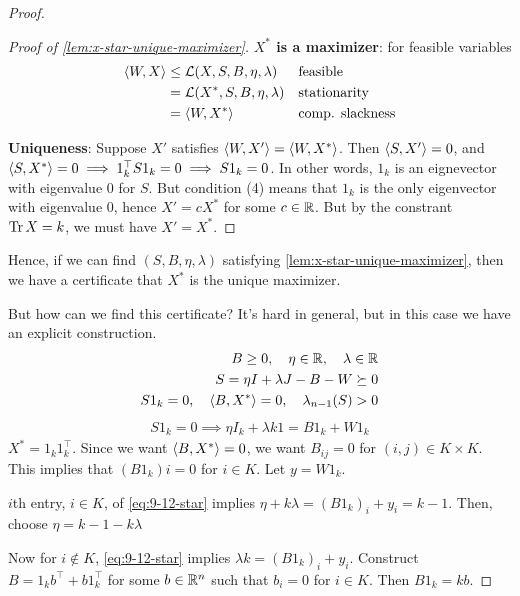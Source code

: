 \begin{proof}
    \begin{proof}[Proof of \cref{lem:x-star-unique-maximizer}]
        \textbf{$X^*$ is a maximizer}: for feasible variables
        \begin{align}
            \braket{W, X} &\leq \mathcal{L}(X, S, B, \eta, \lambda) &&\text{feasible} \\
            &= \mathcal{L}(X^*, S, B, \eta, \lambda) &&\text{stationarity} \\
            &= \braket{W, X^*} &&\text{comp. slackness}
        \end{align}
        
        \textbf{Uniqueness}: Suppose $X'$ satisfies $\braket{W, X'} = \braket{W, X^*}$.
        Then $\braket{S, X'} = 0$, and
        $\braket{S, X^*} = 0 \implies 1_k^\top S 1_k = 0 \implies S 1_k = 0$.
        In other words, $1_k$ is an eignevector with eigenvalue $0$ for $S$.
        But condition (4) means that $1_k$ is the only eigenvector with eigenvalue
        $0$, hence $X' = c X^*$ for some $c \in \mathbb{R}$. But by the
        constrant $\operatorname{Tr} X = k$, we must have $X' = X^*$.
    \end{proof}
    
    Hence, if we can find $(S, B, \eta, \lambda)$ satisfying \cref{lem:x-star-unique-maximizer}, then we have a certificate that
    $X^*$ is the unique maximizer.
    
    But how can we find this certificate? It's hard in general, but in this
    case we have an explicit construction.
    \begin{align}
        B \geq 0, \quad \eta \in \mathbb{R}, \quad \lambda \in \mathbb{R} \\
        S = \eta I + \lambda J - B - W \succeq 0 \\
        S 1_k = 0, \quad \braket{B, X^*} = 0, \quad \lambda_{n-1}(S) > 0 \label{eq:9-12-star}
    \end{align}
    \begin{align}
        S 1_k = 0 \implies \eta I_k + \lambda k 1 = B 1_k + W 1_k
    \end{align}
    $X^* = 1_k 1_k^\top$. Since we want $\braket{B, X^*} = 0$, we want
    $B_{ij} = 0$ for $(i,j) \in K \times K$.
    This implies that $(B 1_k)i = 0$ for $i \in K$.
    Let $y = W 1_k$.
    
    $i$th entry, $i \in K$, of \cref{eq:9-12-star} implies $\eta + k \lambda = (B 1_k)_i + y_i = k-1$. Then, choose $\eta = k - 1 - k \lambda$
    
    Now for $i \not\in K$, \cref{eq:9-12-star} implies $\lambda k = (B 1_k)_i + y_i$.
    Construct $B = 1_k b^\top + b 1_k^\top$ for some $b \in \mathbb{R}^n$ such
    that $b_i = 0$ for $i \in K$.
    Then $B 1_k = k b$.
    

\end{proof}
